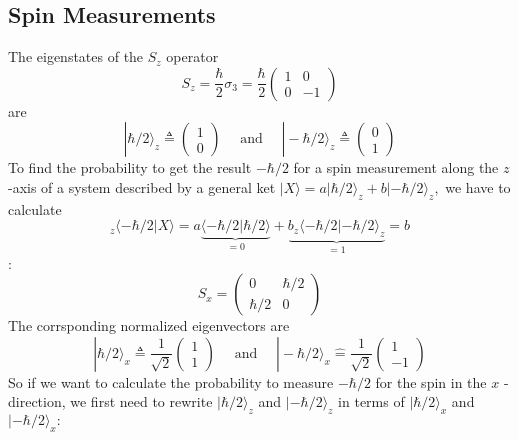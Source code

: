 \subsection{Spin Measurements}
The eigenstates of the $S_{z}$ operator
$$
S_{z}=\frac{\hbar}{2} \sigma_{3}=\frac{\hbar}{2}\left(\begin{array}{cc}
{1} & {0} \\
{0} & {-1}
\end{array}\right)
$$
are
\begin{equation}
|\hbar / 2\rangle_{z} \triangleq\left(\begin{array}{l}
{1} \\
{0}
\end{array}\right) \quad \text { and } \quad|-\hbar / 2\rangle_{z} \triangleq\left(\begin{array}{l}
{0} \\
{1}
\end{array}\right)
\end{equation}
To find the probability to get the result $-\hbar / 2$ for a spin measurement along the $z$ -axis of a system described by a general ket $|X\rangle= a|\hbar / 2\rangle_{z}+b|-\hbar / 2\rangle_{z},$ we have to calculate
\begin{equation}
_{z}\langle-\hbar / 2 | X\rangle= a \underbrace{\langle-\hbar / 2 | \hbar / 2\rangle}_{=0}+\underbrace{b_{z}\langle-\hbar / 2 |-\hbar / 2\rangle_{z}}_{=1}=b
\end{equation}
:
$$
S_{x}=\left(\begin{array}{cc}
{0} & {\hbar / 2} \\
{\hbar / 2} & {0}
\end{array}\right)
$$
The corrsponding normalized eigenvectors are
$$
|\hbar / 2\rangle_{x} \triangleq \frac{1}{\sqrt{2}}\left(\begin{array}{l}
{1} \\
{1}
\end{array}\right) \quad \text { and } \quad|-\hbar / 2\rangle_{x} \hat{=} \frac{1}{\sqrt{2}}\left(\begin{array}{c}
{1} \\
{-1}
\end{array}\right)
$$
So if we want to calculate the probability to measure $-\hbar / 2$ for the spin in the $x$ -direction, we first need to rewrite $|\hbar / 2\rangle_{z}$ and $|-\hbar / 2\rangle_{z}$ in terms of $|\hbar / 2\rangle_{x}$ and $|-\hbar / 2\rangle_{x}:$
